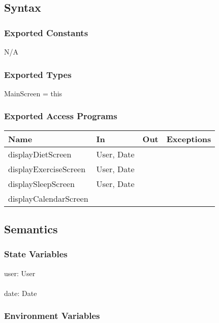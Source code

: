 \documentclass[12pt, titlepage]{article}
\begin{document}
\subsection{Syntax}

\subsubsection{Exported Constants}
N/A

\subsubsection{Exported Types}
MainScreen = this

\subsubsection{Exported Access Programs}

\begin{tabular}{| l | l | l | l |}
	\hline
	{\textbf{Name}} & {\textbf{In}} & {\textbf{Out}} & {\textbf{Exceptions}}\\
	\hline
	{displayDietScreen} & User, Date & & \\
	\hline
	{displayExerciseScreen} & User, Date & & \\
	\hline
	{displaySleepScreen} & User, Date & & \\
	\hline
	{displayCalendarScreen} & & & \\
	\hline
\end{tabular}

\subsection{Semantics}

\subsubsection{State Variables}

user: User\\\\
date: Date


\subsubsection{Environment Variables}
\end{document}
